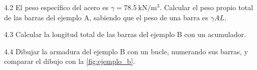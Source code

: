 \begin{ejercicio}{4.2}
El peso específico del acero es $\gamma = \SI{78.5}{\kilo\newton\per\metre\cubed}$.
Calcular el peso propio total de las barras del ejemplo A, sabiendo que el
peso de una barra es $\gamma A L$.
\end{ejercicio}

\begin{ejercicio}{4.3}
Calcular la longitud total de las barras del ejemplo B con un acumulador.
\end{ejercicio}

\begin{ejercicio}{4.4}
Dibujar la armadura del ejemplo B con un bucle, numerando sus barras, y
comparar el dibujo con la \cref{fig:ejemplo_b}.
\end{ejercicio}

